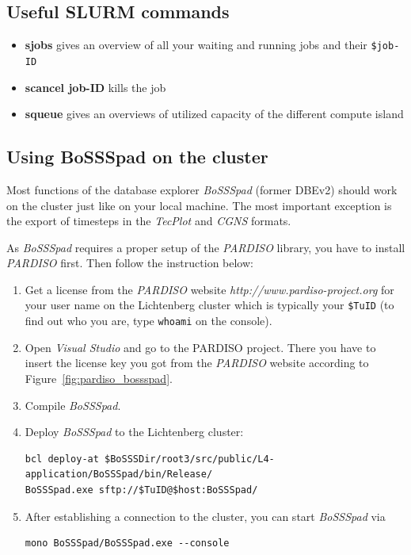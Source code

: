 \documentclass[11pt,twoside,a4paper]{fdyartcl}
\begin{document}
\subsection{Useful SLURM commands}
\label{sec:lsf_commands}
\begin{itemize}
\item \textbf{sjobs} gives an overview of all your waiting and running jobs and their \verb|$job-ID|
\item \textbf{scancel job-ID} kills the job
\item \textbf{squeue} gives an overviews of utilized capacity of the different compute island
\end{itemize}


\subsection{Using BoSSSpad on the cluster}
\label{sec:dbe}

Most functions of the database explorer \emph{BoSSSpad} (former DBEv2) should work on the cluster just like on your local machine. The most important exception is the export of timesteps in the \emph{TecPlot} and \emph{CGNS} formats.

As \emph{BoSSSpad} requires a proper setup of the \emph{PARDISO} library, you have to install \emph{PARDISO} first. Then follow the instruction below:
\begin{enumerate}
\item Get a license from the \emph{PARDISO} website \emph{http://www.pardiso-project.org} for your user name on the Lichtenberg cluster which is typically your \verb|$TuID| (to find out who you are, type \verb|whoami| on the console).
\item Open \emph{Visual Studio} and go to the PARDISO project. There you have to insert the license key you got from the \emph{PARDISO} website according to Figure~\ref{fig:pardiso_bossspad}.
\item Compile \emph{BoSSSpad}.
\item Deploy \emph{BoSSSpad} to the Lichtenberg cluster: \begin{verbatim}
bcl deploy-at $BoSSSDir/root3/src/public/L4-application/BoSSSpad/bin/Release/
BoSSSpad.exe sftp://$TuID@$host:BoSSSpad/
\end{verbatim}
\item After establishing a connection to the cluster, you can start \emph{BoSSSpad} via
\begin{verbatim}
mono BoSSSpad/BoSSSpad.exe --console
\end{verbatim}
\end{enumerate}
\end{document}
